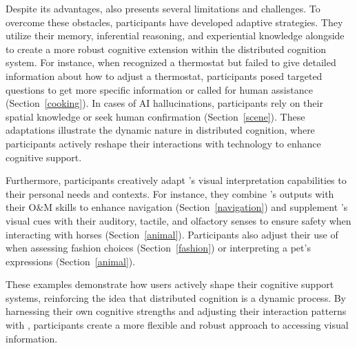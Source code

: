 Despite its advantages, \bma{} also presents several limitations and challenges.
To overcome these obstacles, participants have developed adaptive strategies.
They utilize their memory, inferential reasoning, and experiential knowledge alongside \bma{} to create a more robust cognitive extension within the distributed cognition system. 
For instance, when \bma{} recognized a thermostat but failed to give detailed information about how to adjust a thermostat, participants posed targeted questions to get more specific information or called for human assistance (Section~\ref{cooking}). 
In cases of AI hallucinations, participants rely on their spatial knowledge or seek human confirmation (Section~\ref{scene}). These adaptations illustrate the dynamic nature in distributed cognition, where participants actively reshape their interactions with technology to enhance cognitive support.
% 


Furthermore, participants creatively adapt \bma's visual interpretation capabilities to their personal needs and contexts. For instance, they combine \bma's outputs with their O\&M skills to enhance navigation (Section~\ref{navigation}) and supplement \bma's visual cues with their auditory, tactile, and olfactory senses to ensure safety when interacting with horses (Section~\ref{animal}). 
Participants also adjust their use of \bma{} when assessing fashion choices (Section~\ref{fashion}) or interpreting a pet’s expressions (Section~\ref{animal}).

These examples demonstrate how users actively shape their cognitive support systems, reinforcing the idea that distributed cognition is a dynamic process. By harnessing their own cognitive strengths and adjusting their interaction patterns with \bma, participants create a more flexible and robust approach to accessing visual information. 






